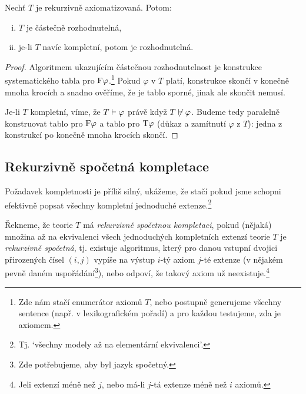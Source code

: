 \begin{proposition}
    Nechť $T$ je rekurzivně axiomatizovaná. Potom:
    \begin{enumerate}[(i)]
        \item $T$ je částečně rozhodnutelná,
        \item je-li $T$ navíc kompletní, potom je rozhodnutelná.
    \end{enumerate}
\end{proposition}
\begin{proof}
Algoritmem ukazujícím částečnou rozhodnutelnost je konstrukce systematického tabla pro $\mathrm{F}\varphi$.\footnote{Zde nám stačí enumerátor axiomů $T$, nebo postupně generujeme všechny sentence (např. v lexikografickém pořadí) a pro každou testujeme, zda je axiomem.} Pokud $\varphi$ v $T$ platí, konstrukce skončí v konečně mnoha krocích a snadno ověříme, že je tablo sporné, jinak ale skončit nemusí.

Je-li $T$ kompletní, víme, že $T\vdash\varphi$ právě když $T\not\vdash\varphi$. Budeme tedy paralelně konstruovat tablo pro $\mathrm{F}\varphi$ a tablo pro $\mathrm{T}\varphi$ (důkaz a zamítnutí $\varphi$ z $T$): jedna z konstrukcí po konečně mnoha krocích skončí.
\end{proof}


\subsection{Rekurzivně spočetná kompletace}

Požadavek kompletnosti je příliš silný, ukážeme, že stačí pokud jsme schopni efektivně popsat všechny kompletní jednoduché extenze.\footnote{Tj. `všechny modely až na elementární ekvivalenci'.}

\begin{definition}
Řekneme, že teorie $T$ má \emph{rekurzivně spočetnou kompletaci}, pokud (nějaká) množina až na ekvivalenci všech jednoduchých kompletních extenzí teorie $T$ je \emph{rekurzivně spočetná}, tj. existuje algoritmus, který pro danou vstupní dvojici přirozených čísel $(i,j)$ vypíše na výstup $i$-tý axiom $j$-té extenze (v nějakém pevně daném uspořádání\footnote{Zde potřebujeme, aby byl jazyk spočetný.}), nebo odpoví, že takový axiom už neexistuje.\footnote{Jeli extenzí méně než $j$, nebo má-li $j$-tá extenze méně než $i$ axiomů.}
\end{definition}

